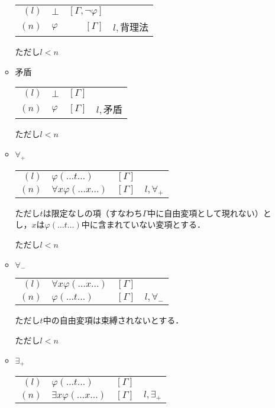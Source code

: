 \documentclass[10pt,b5paper,papersize,dvipdfmx]{jsbook}
\begin{document}
\begin{itemize}
\begin{itemize}
\begin{table}[H]
\begin{center}
\begin{tabular}{rlrl}
$(l)$&$\bot$&$[\Gamma,\lnot \varphi]$& \\
$(n)$&$\varphi$&$[\Gamma]$&$l,$背理法
\end{tabular}
\end{center}
\end{table}
ただし$l<n$
\item 矛盾
\begin{table}[H]
\begin{center}
\begin{tabular}{rlrl}
$(l)$&$\bot$&$[\Gamma]$& \\
$(n)$&$\varphi$&$[\Gamma]$&$l,$矛盾
\end{tabular}
\end{center}
\end{table}
ただし$l<n$
\item $\forall_+$
\begin{table}[H]
\begin{center}
\begin{tabular}{rlrl}
$(l)$&$\varphi(\dots t \dots)$&$[\Gamma]$& \\
$(n)$&$\forall x \varphi(\dots x \dots)$&$[\Gamma]$&$l,\forall_+$
\end{tabular}
\end{center}
\end{table}
ただし$t$は限定なしの項（すなわち$\Gamma$中に自由変項として現れない）とし，$x$は$\varphi(\dots t \dots)$中に含まれていない変項とする． \par
ただし$l<n$
\item $\forall_-$
\begin{table}[H]
\begin{center}
\begin{tabular}{rlrl}
$(l)$&$\forall x\varphi(\dots x \dots)$&$[\Gamma]$& \\
$(n)$&$\varphi(\dots t \dots)$&$[\Gamma]$&$l,\forall_-$
\end{tabular}
\end{center}
\end{table}
ただし$t$中の自由変項は束縛されないとする．\par
ただし$l<n$
\item $\exists_+$
\begin{table}[H]
\begin{center}
\begin{tabular}{rlrl}
$(l)$&$\varphi(\dots t \dots)$&$[\Gamma]$& \\
$(n)$&$\exists x\varphi(\dots x \dots)$&$[\Gamma]$&$l,\exists_+$

\end{tabular}
\end{center}
\end{table}
\end{itemize}
\end{itemize}
\end{document}
